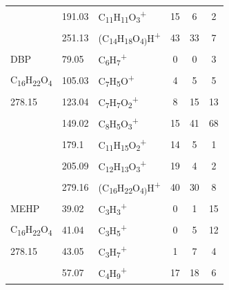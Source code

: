 {\begin{longtable}[c]{lllccc}
          & 191.03               & C\textsubscript{11}H\textsubscript{11}O\textsubscript{3}\textsuperscript{+}    & 15           & 6            & 2            \\
          & 251.13               & (C\textsubscript{14}H\textsubscript{18}O\textsubscript{4)}H\textsuperscript{+} & 43           & 33           & 7            \\
\hline
DBP                                                      & 79.05  & C\textsubscript{6}H\textsubscript{7}\textsuperscript{+}                        & 0  & 0  & 3  \\
C\textsubscript{16}H\textsubscript{22}O\textsubscript{4} & 105.03 & C\textsubscript{7}H\textsubscript{5}O\textsuperscript{+}                       & 4  & 5  & 5  \\
278.15                                                   & 123.04 & C\textsubscript{7}H\textsubscript{7}O\textsubscript{2}\textsuperscript{+}      & 8  & 15 & 13 \\
                                                         & 149.02 & C\textsubscript{8}H\textsubscript{5}O\textsubscript{3}\textsuperscript{+}      & 15 & 41 & 68 \\
                                                         & 179.1  & C\textsubscript{11}H\textsubscript{15}O\textsubscript{2}\textsuperscript{+}    & 14 & 5  & 1  \\
                                                         & 205.09 & C\textsubscript{12}H\textsubscript{13}O\textsubscript{3}\textsuperscript{+}    & 19 & 4  & 2  \\
                                                         & 279.16 & (C\textsubscript{16}H\textsubscript{22}O\textsubscript{4)}H\textsuperscript{+} & 40 & 30 & 8 \\
\hline
MEHP                                                     & 39.02  & C\textsubscript{3}H\textsubscript{3}\textsuperscript{+}                   & 0  & 1  & 15 \\
C\textsubscript{16}H\textsubscript{22}O\textsubscript{4} & 41.04  & C\textsubscript{3}H\textsubscript{5}\textsuperscript{+}                   & 0  & 5  & 12 \\
278.15                                                   & 43.05  & C\textsubscript{3}H\textsubscript{7}\textsuperscript{+}                   & 1  & 7  & 4  \\
                                                         & 57.07  & C\textsubscript{4}H\textsubscript{9}\textsuperscript{+}                   & 17 & 18 & 6  \\

\end{longtable}}
